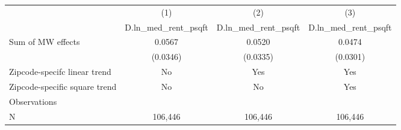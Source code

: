 {
\def\sym#1{\ifmmode^{#1}\else\(^{#1}\)\fi}
\begin{tabular}{l*{3}{c}}
\hline\hline
          &\multicolumn{1}{c}{(1)}&\multicolumn{1}{c}{(2)}&\multicolumn{1}{c}{(3)}\\
          &\multicolumn{1}{c}{D.ln\_med\_rent\_psqft}&\multicolumn{1}{c}{D.ln\_med\_rent\_psqft}&\multicolumn{1}{c}{D.ln\_med\_rent\_psqft}\\
\hline
Sum of MW effects&   0.0567         &   0.0520         &   0.0474         \\
          & (0.0346)         & (0.0335)         & (0.0301)         \\
\hline
Zipcode-specifc linear trend&       No         &      Yes         &      Yes         \\
Zipcode-specific square trend&       No         &       No         &      Yes         \\
Observations&                  &                  &                  \\
N         &  106,446         &  106,446         &  106,446         \\
\hline\hline
\end{tabular}
}
